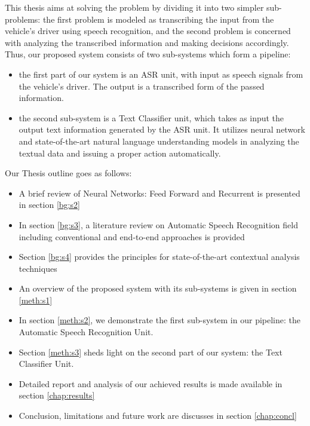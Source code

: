 This thesis aims at solving the problem by dividing it into two simpler sub-problems: the first problem is modeled as transcribing the input from the vehicle's driver using speech recognition, and the second problem is concerned with analyzing the transcribed information and making decisions accordingly. Thus, our proposed system consists of two sub-systems which form a pipeline: 

\begin{itemize}
	\item the first part of our system is an \ac{ASR} unit, with input as speech signals from the vehicle's driver. The output is a transcribed form of the passed information.
	\item the second sub-system is a Text Classifier unit, which takes as input the output text information generated by the \ac{ASR} unit. It utilizes neural network and state-of-the-art natural language understanding models in analyzing the textual data and issuing a proper action automatically.
\end{itemize}



Our Thesis outline goes as follows:

\begin{itemize}
	\item A brief review of Neural Networks: Feed Forward and Recurrent is presented in section \ref{bg:s2}
	\item In section \ref{bg:s3}, a literature review on Automatic Speech Recognition field including conventional and end-to-end approaches is provided
	\item Section \ref{bg:s4} provides the principles for state-of-the-art contextual analysis techniques
	\item An overview of the proposed system with its sub-systems is given in section \ref{meth:s1}
	\item In section \ref{meth:s2}, we demonstrate the first sub-system in our pipeline: the Automatic Speech Recognition Unit.
	\item Section \ref{meth:s3} sheds light on the second part of our system: the Text Classifier Unit.
	\item Detailed report and analysis of our achieved results is made available in section \ref{chap:results}
	\item Conclusion, limitations and future work are discusses in section \ref{chap:concl}
\end{itemize}


